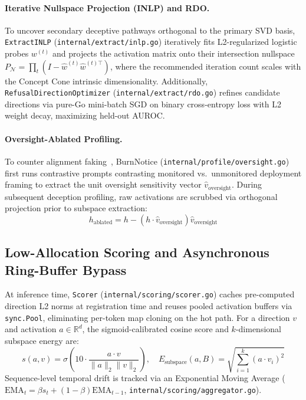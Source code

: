 \documentclass{article}
\begin{document}
\paragraph{Iterative Nullspace Projection (INLP) and RDO.}
To uncover secondary deceptive pathways orthogonal to the primary SVD basis, \texttt{ExtractINLP} (\texttt{internal/extract/inlp.go}) iteratively fits L2-regularized logistic probes $w^{(t)}$ and projects the activation matrix onto their intersection nullspace $P_{\mathcal{N}} = \prod_t (I - \hat{w}^{(t)}\hat{w}^{(t)\top})$, where the recommended iteration count scales with the Concept Cone intrinsic dimensionality. Additionally, \texttt{RefusalDirectionOptimizer} (\texttt{internal/extract/rdo.go}) refines candidate directions via pure-Go mini-batch SGD on binary cross-entropy loss with L2 weight decay, maximizing held-out AUROC.

\paragraph{Oversight-Ablated Profiling.}
To counter alignment faking~\cite{alignmentfaking2025}, BurnNotice (\texttt{internal/profile/oversight.go}) first runs contrastive prompts contrasting monitored vs.\ unmonitored deployment framing to extract the unit oversight sensitivity vector $\hat{v}_{\text{oversight}}$. During subsequent deception profiling, raw activations are scrubbed via orthogonal projection prior to subspace extraction:
\begin{equation}
    h_{\text{ablated}} = h - (h \cdot \hat{v}_{\text{oversight}})\hat{v}_{\text{oversight}}
\end{equation}

\subsection{Low-Allocation Scoring and Asynchronous Ring-Buffer Bypass}\label{sec:scoring}

At inference time, \texttt{Scorer} (\texttt{internal/scoring/scorer.go}) caches pre-computed direction L2 norms at registration time and reuses pooled activation buffers via \texttt{sync.Pool}, eliminating per-token map cloning on the hot path. For a direction $v$ and activation $a \in \mathbb{R}^d$, the sigmoid-calibrated cosine score and $k$-dimensional subspace energy are:
\begin{equation}
    s(a, v) = \sigma\!\left(10 \cdot \frac{a \cdot v}{\|a\|_2 \|v\|_2}\right), \quad E_{\text{subspace}}(a, B) = \sqrt{\sum_{i=1}^k (a \cdot v_i)^2}
\end{equation}
Sequence-level temporal drift is tracked via an Exponential Moving Average ($\text{EMA}_t = \beta s_t + (1-\beta)\text{EMA}_{t-1}$, \texttt{internal/scoring/aggregator.go}).
\end{document}

